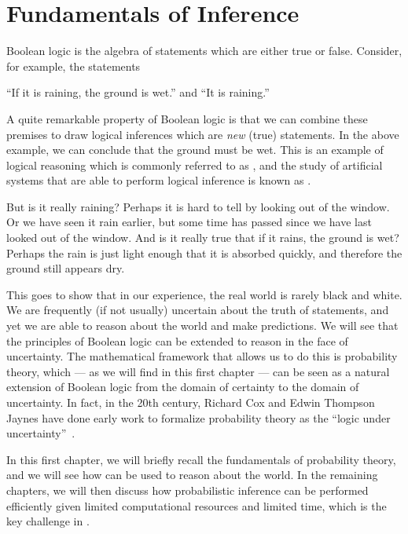 \chapter{Fundamentals of Inference}\label{sec:fundamentals}

Boolean logic is the algebra of statements which are either true or false.
Consider, for example, the statements \begin{center}
  ``If it is raining, the ground is wet.'' \quad and \quad ``It is raining.''
\end{center}
A quite remarkable property of Boolean logic is that we can combine these premises to draw logical inferences which are \emph{new} (true) statements.
In the above example, we can conclude that the ground must be wet.
This is an example of logical reasoning which is commonly referred to as , and the study of artificial systems that are able to perform logical inference is known as .

But is it really raining?
Perhaps it is hard to tell by looking out of the window.
Or we have seen it rain earlier, but some time has passed since we have last looked out of the window.
And is it really true that if it rains, the ground is wet?
Perhaps the rain is just light enough that it is absorbed quickly, and therefore the ground still appears dry.

This goes to show that in our experience, the real world is rarely black and white.
We are frequently (if not usually) uncertain about the truth of statements, and yet we are able to reason about the world and make predictions.
We will see that the principles of Boolean logic can be extended to reason in the face of uncertainty.
The mathematical framework that allows us to do this is probability theory, which --- as we will find in this first chapter --- can be seen as a natural extension of Boolean logic from the domain of certainty to the domain of uncertainty.
In fact, in the 20th century, Richard Cox and Edwin Thompson Jaynes have done early work to formalize probability theory as the ``logic under uncertainty''~\citep{cox2001algebra,jaynes2003probability}.

In this first chapter, we will briefly recall the fundamentals of probability theory, and we will see how  can be used to reason about the world.
In the remaining chapters, we will then discuss how probabilistic inference can be performed efficiently given limited computational resources and limited time, which is the key challenge in .

